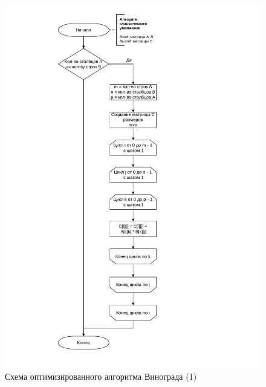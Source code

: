\begin{figure}[h]
	\centering
	\includegraphics[height=0.9\textheight, page=4]{algo-scheme.pdf}
	\caption{Схема оптимизированного алгоритма Винограда (1)}
	\label{fig:vinograd_opt}
\end{figure}

